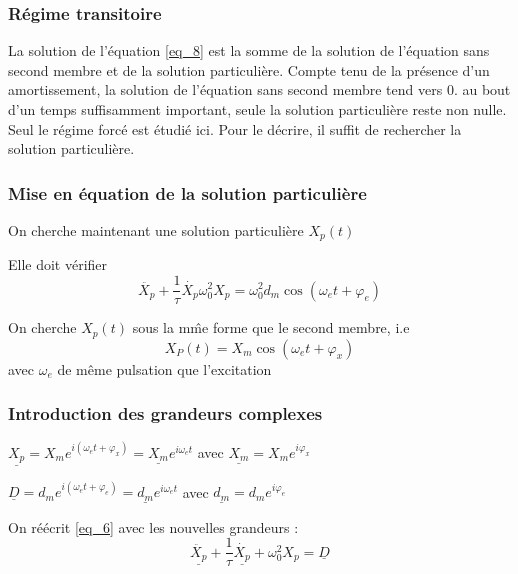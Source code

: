 \documentclass[french]{yLectureNote}
\begin{document}
\subsubsection{Régime transitoire}
La solution de l’équation \eqref{eq_8} est la somme de la solution de l’équation sans second membre
et de la solution particulière. Compte tenu de la présence d’un amortissement, la solution
de l’équation sans second membre tend vers 0. au bout d’un temps suffisamment important,
seule la solution particulière reste non nulle. Seul le régime forcé
est étudié ici. Pour le décrire, il suffit de rechercher la solution particulière.
\subsubsection{Mise en équation de la solution particulière}
On cherche maintenant une solution particulière $X_p(t)$

Elle doit vérifier
\begin{equation}
 \ddot{X_p} + \frac{1}{\tau}\dot{X_p} \omega_0^2X_p = \omega_0^2 d_m \cos(\omega_e t + \varphi_e)\label{eq_6}
\end{equation}



On cherche $X_p(t)$ sous la m\^me forme que le second membre, i.e \begin{equation}
                                                               X_P(t) = X_m\cos(\omega_et+\varphi_x)
                                                              \end{equation}
avec $\omega_e$ de m\^eme pulsation que l'excitation

\subsubsection{Introduction des grandeurs complexes}
$\underline{X_p} = X_me^{i(\omega_e t + \varphi_x)} = \underline{X_m} e^{i\omega_e t}$ avec $\underline{X_m} =  X_me^{i\varphi_x}$

$\underline{D} = d_m e^{i(\omega_e t + \varphi_e)} = \underline{d_m} e^{i\omega_e t} $ avec $\underline{d_m} = d_m e^{i\varphi_e}$

On réécrit \eqref{eq_6} avec les nouvelles grandeurs :
\begin{equation}
\ddot{\underline{X_p}} +  \frac{1}{\tau}\dot{\underline{X_p}} + \omega_0^2X_p = \underline{D}\label{eq_7}
\end{equation}
\end{document}
